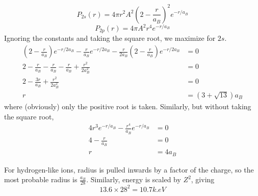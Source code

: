 \documentclass[answers]{exam}
\begin{document}
\begin{questions}
\begin{solution}
	$$P_{2s}(r) = 4\pi r^2 A^2\left(2-\frac{r}{a_B}\right)^2 e^{-r/a_B}$$
	$$P_{2p}(r) = 4\pi A^2r^4e^{-r/a_B}$$
	Ignoring the constants and taking the square root, we maximize for $2s$.
	\begin{align*}
		\left(2-\frac{r}{a_B}\right)e^{-r/2a_B} - \frac{r}{a_B} e^{-r/2a_B} - \frac{r}{2a_B}\left(2-\frac{r}{a_B}\right) e^{-r/2a_B} &= 0 \\
		2-\frac{r}{a_B} - \frac{r}{a_B} - \frac{r}{a_B} + \frac{r^2}{2a^2_B} &= 0 \\
		2 - \frac{3r}{a_B} + \frac{r^2}{2a^2_B} &= 0 \\
		r &= (3+\sqrt{13})a_B
	\end{align*}
	where (obviously) only the positive root is taken. Similarly, but without taking the square root,
	\begin{align*}
		4r^3e^{-r/a_B} - \frac{r^4}{a_B}e^{-r/a_B} &= 0 \\
		4 - \frac{r}{a_B} &= 0 \\
		r &= 4a_B
	\end{align*}
\end{solution}


\begin{solution}
	For hydrogen-like ions, radius is pulled inwards by a factor of the charge, so the most probable radius is $\frac{a_B}{28}$. Similarly, energy is scaled by $Z^2$, giving
	$$13.6 \times 28^2 = 10.7\unit{k.eV}$$
\end{solution}
\end{questions}
\end{document}
